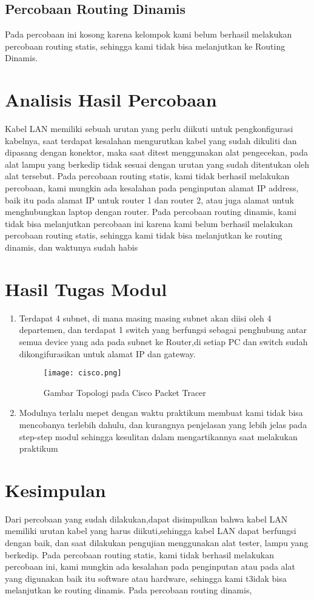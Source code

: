 \subsection{Percobaan Routing Dinamis}
Pada percobaan ini kosong karena kelompok kami belum berhasil melakukan percobaan routing statis,
sehingga kami tidak bisa melanjutkan ke Routing Dinamis.

\section{Analisis Hasil Percobaan}
Kabel LAN memiliki sebuah urutan yang perlu diikuti untuk pengkonfigurasi kabelnya, saat terdapat kesalahan
mengurutkan kabel yang sudah dikuliti dan dipasang dengan konektor, maka saat ditest menggunakan alat 
pengecekan, pada alat lampu yang berkedip tidak sesuai dengan urutan yang sudah ditentukan oleh alat tersebut.
Pada percobaan routing statis, kami tidak berhasil melakukan percobaan, kami mungkin ada kesalahan pada penginputan 
alamat IP address, baik itu pada alamat IP untuk router 1 dan router 2, atau juga alamat untuk menghubungkan
laptop dengan router. Pada percobaan routing dinamis, kami tidak bisa melanjutkan percobaan ini karena kami belum berhasil
melakukan percobaan routing statis, sehingga kami tidak bisa melanjutkan ke routing dinamis, dan waktunya
sudah habis
\section{Hasil Tugas Modul}
\begin{enumerate}
    \item Terdapat 4 subnet, di mana masing masing subnet akan diisi oleh 4 departemen, dan terdapat 1 switch
    yang berfungsi sebagai penghubung antar semua device yang ada pada subnet ke Router,di setiap PC dan switch
    sudah dikongifurasikan untuk alamat IP dan gateway. 
	\begin{figure}[H]
		\centering
		\texttt{[image: cisco.png]}
		\caption{Gambar Topologi pada Cisco Packet Tracer}
		\label{fig:gambar1}
	\end{figure}
    \item Modulnya terlalu mepet dengan waktu praktikum membuat kami tidak bisa mencobanya terlebih dahulu, dan kurangnya penjelasan yang lebih jelas 
    pada step-step modul sehingga kesulitan dalam mengartikannya saat melakukan praktikum
\end{enumerate}


\section{Kesimpulan}
Dari percobaan yang sudah dilakukan,dapat disimpulkan bahwa kabel LAN memiliki urutan kabel yang harus diikuti,sehingga
kabel LAN dapat berfungsi dengan baik, dan saat dilakukan pengujian menggunakan alat tester, lampu yang berkedip.
Pada percobaan routing statis, kami tidak berhasil melakukan percobaan ini, kami mungkin ada kesalahan pada penginputan
atau pada alat yang digunakan baik itu software atau hardware, sehingga kami t3idak bisa melanjutkan ke routing dinamis. Pada percobaan routing dinamis,

